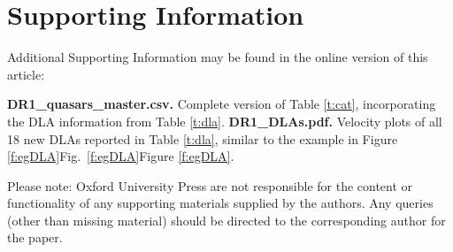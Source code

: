 \documentclass[fleqn,usenatbib,usedcolumn]{mnras}
\newcommand{\Tref}[1]{Table \ref{#1}}
\newcommand{\Fref}[1]{\ifhmode \ifnum\spacefactor=1001 Figure \ref{#1}\else Fig.\ \ref{#1}\fi \else Figure \ref{#1}\fi}
\begin{document}






\section*{Supporting Information}\label{sec:supp}

Additional Supporting Information may be found in the online version
of this article:\vspace{-0.5em}\newline

\noindent \textbf{DR1\_quasars\_master.csv.} Complete version of \Tref{t:cat}, incorporating the DLA information from \Tref{t:dla}.\vspace{-0.1em}\newline
\noindent \textbf{DR1\_DLAs.pdf.} Velocity plots of all 18 new DLAs reported in \Tref{t:dla}, similar to the example in \Fref{f:egDLA}.\vspace{-0.5em}\newline

\noindent Please note: Oxford University Press are not responsible for the
content or functionality of any supporting materials supplied by
the authors. Any queries (other than missing material) should be
directed to the corresponding author for the paper.


\bsp	%
\label{lastpage}
\end{document}
